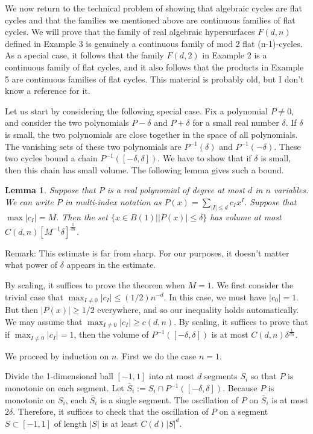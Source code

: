 \documentclass{amsart}
\newtheorem*{Theorem 1}{Theorem 1}
\newtheorem*{Theorem 2}{Theorem 2}
\newtheorem*{Theorem 1A}{Theorem 1A}
\newtheorem*{Theorem 2A}{Theorem 2A}
\newtheorem{lemma}{Lemma}[section]
\newtheorem*{vanishing lemma}{Vanishing Lemma}
\numberwithin{equation}{section}
\begin{document}
We now return to the technical problem of showing that algebraic
cycles are flat cycles and that the families we mentioned above
are continuous families of flat cycles.  We will prove that the
family of real algebraic hypersurfaces $F(d,n)$ defined in
Example 3 is genuinely a continuous family of mod 2 flat
(n-1)-cycles.  As a special case, it follows that the family
$F(d,2)$ in Example 2 is a continuous family of flat cycles, and
it also follows that the products in Example 5 are continuous
families of flat cycles.  This material is probably old, but I
don't know a reference for it.

Let us start by considering the following special case.  Fix a
polynomial $P \not= 0$, and consider the two polynomials $P -
\delta$ and $P + \delta$ for a small real number $\delta$.  If
$\delta$ is small, the two polynomials are close together in the
space of all polynomials.  The vanishing sets of these two
polynomials are $P^{-1}(\delta)$ and $P^{-1}(-\delta)$.  These
two cycles bound a chain $P^{-1}([-\delta, \delta])$.  We have to
show that if $\delta$ is small, then this chain has small volume. 
The following lemma gives such a bound.

\begin{lemma} Suppose that $P$ is a real polynomial of degree at
most $d$ in $n$ variables.  We can write $P$ in multi-index
notation as $P(x) = \sum_{|I| \le d} c_I x^I$.  Suppose that
$\max |c_I| = M$.  Then the set $\{ x \in B(1) | |P(x)| \le
\delta \}$ has volume at most $C(d,n) [M^{-1} \delta]^{\frac{1}{dn}}$.
\end{lemma}

Remark: This estimate is far from sharp.  For our purposes, it 
doesn't matter what power of $\delta$ appears in the estimate.

\proof By scaling, it suffices to prove the theorem when $M=1$.
We first consider the trivial case that $\max_{I \not= 0} |c_I| \le (1/2) n^{-d}$.
In this case, we must have $|c_0| = 1$.  But then
$|P(x)| \ge 1/2$ everywhere, and so our inequality holds
automatically.  We may assume that $\max_{I \not=0} |c_I| \ge c(d,n)$.
By scaling, it suffices to prove that if $\max_{I \not= 0} |c_I| = 1$, then the
volume of $P^{-1}([-\delta, \delta])$ is at most $C(d,n) \delta^{\frac{1}{dn}}$.

We proceed by induction on $n$.  First we do the case $n=1$.

Divide the 1-dimensional ball $[-1, 1]$ into at most $d$ segments
$S_i$ so that $P$ is monotonic on each segment.  Let $\bar S_i :=
S_i \cap P^{-1}([- \delta, \delta])$. Because $P$ is monotonic on
$S_i$, each $\bar S_i$ is a single segment.  The oscillation of
$P$ on $\bar S_i$ is at most $2 \delta$.  Therefore, it suffices
to check that the oscillation of $P$ on a segment $S \subset [-1,
1]$ of length $|S|$ is at least $C(d) |S|^d$.
\end{document}
